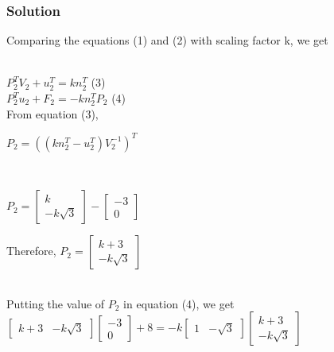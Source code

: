 \documentclass{beamer}
\begin{document}

\begin{frame} %
\frametitle{Solution}
Comparing the equations (1) and (2) with scaling factor k, we get

\\ \vspace{5} $P_{2}^{T}V_{2}+u_{2}^{T}=kn_{2}^{T}$ \implies (3)
\\ \vspace{5} $P_{2}^{T}u_{2}+F_{2}=-kn_{2}^{T}P_{2}$ \implies (4)
\\ From equation (3),
\\
\centerline{ $ P_{2} = ((kn_{2}^{T} - u_{2}^{T})V_{2}^{-1})^{T}$}
\\
\centerline{ $P_{2}= \begin{bmatrix}
k \\ -k\sqrt{3}
\end{bmatrix}
-
\begin{bmatrix}
-3 \\ 0
\end{bmatrix}
$}
Therefore, $P_{2}=\begin{bmatrix}
k+3 \\ -k\sqrt3
\end{bmatrix}$

\\Putting the value of $P_{2}$  in  equation   (4), we   get
\\$\begin{bmatrix}
k+3 & -k\sqrt3
\end{bmatrix}
\begin{bmatrix}
-3 \\ 0
\end{bmatrix} + 8=-k\begin{bmatrix}
1 & -\sqrt3
\end{bmatrix}\begin{bmatrix}
k+3 \\ -k\sqrt3
\end{bmatrix}$
\end{frame}

\end{document}
